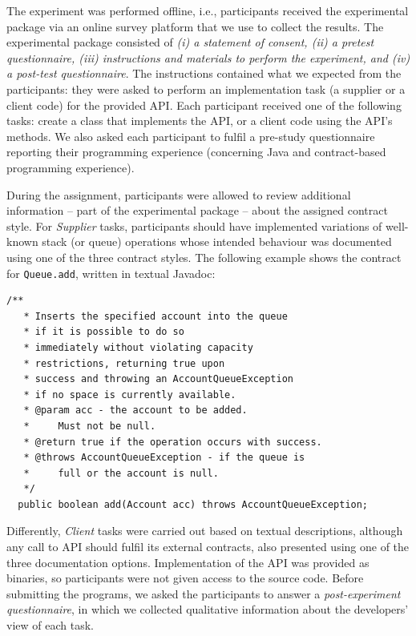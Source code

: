 The experiment was performed offline, i.e., participants received the experimental package via an online survey platform that we use to collect the results.
The experimental package consisted of \emph{(i) a statement of consent, (ii) a pretest
questionnaire, (iii) instructions and materials to perform the experiment, and (iv) a post-test questionnaire}. 
The instructions contained what we expected from the participants: they were asked to perform an implementation task (a supplier or a client code) for the
provided API. Each participant received one of the following tasks: create a class that implements the API, or a client code using the API's methods.
We also asked each participant to fulfil a pre-study questionnaire reporting their programming experience (concerning Java and contract-based programming experience). 

During the assignment, participants were allowed to review additional information -- part of the experimental package -- about the assigned contract style. 
For \textit{Supplier} tasks, participants should have implemented variations of well-known stack (or queue) operations whose intended behaviour was documented using one of the three contract styles. The following example shows the contract for \lstinline!Queue.add!, written in textual Javadoc:

\begin{lstlisting}[basicstyle=\footnotesize\ttfamily,name=figxpi, frame=lines, mathescape=true]
/**
   * Inserts the specified account into the queue 
   * if it is possible to do so 
   * immediately without violating capacity 
   * restrictions, returning true upon 
   * success and throwing an AccountQueueException 
   * if no space is currently available.
   * @param acc - the account to be added. 
   *     Must not be null.
   * @return true if the operation occurs with success.
   * @throws AccountQueueException - if the queue is 
   *     full or the account is null.
   */
  public boolean add(Account acc) throws AccountQueueException;
\end{lstlisting}

Differently, \textit{Client} tasks were carried out based on textual descriptions, although any call to API should fulfil its external contracts, also presented using one of the three documentation options. Implementation of the API was provided as binaries, so participants were not given access to the source code.
Before submitting the programs, we asked the participants to answer a \emph{post-experiment questionnaire}, in which we collected qualitative information about the developers' view of each task.

